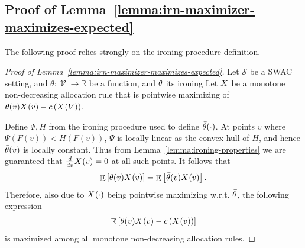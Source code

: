 \documentclass[11pt,letterpaper]{article}
\newcommand{\sqbr}[1]{\left[ #1 \right]}
\newcommand{\brackets}[1]{\left( #1 \right)}
\newcommand{\swac}{SWAC\xspace}
\newcommand{\reals}{\mathbb{R}}
\DeclareMathOperator*{\E}{\bb{E}}
\newcommand{\bb}[1]{\mathbb{#1}}
\renewcommand{\S}{\mathcal{S}}
\DeclareMathOperator{\V}{\mathcal{V}}
\theoremstyle{plain}
\begin{document}
\subsection{Proof of Lemma~\ref{lemma:irn-maximizer-maximizes-expected}}
\label{sec:proof-optimal-rental-mechs}
The following proof relies strongly on the ironing procedure definition.
\begin{proof}[Proof of Lemma~\ref{lemma:irn-maximizer-maximizes-expected}]
 Let $\S$ be a \swac setting, and $\theta:\V\rightarrow\reals$ be a function, and $\Bar{\theta}$ its ironing
    Let $\alloc$ be a monotone non-decreasing allocation rule that is pointwise maximizing of $\Bar{\theta}(v)\x{v}-c\brackets{\x{V}}$.
    
    Define $\Psi,H$ from the ironing procedure used to define $\Bar{\theta}(\cdot)$.
    At points $v$ where $\Psi(F(v))<H(F(v))$, $\Psi$ is locally linear as the convex hull of $H$, and hence $\Bar{\theta}(v)$ is locally constant. Thus from Lemma~\ref{lemma:ironing-properties} we are guaranteed that $\frac{d}{dv}\x{v}=0$ at all such points.
    It follows that
    \begin{equation}
         \E\sqbr{\theta(v)\x{v}}=\E\sqbr{\Bar{\theta}(v)\x{v}}.
    \end{equation}
    Therefore, also due to $\x{\cdot}$ being pointwise maximizing w.r.t. $\Bar{\theta}$, the following expression
    \begin{align}\label{eq:best-rew}
        \E\sqbr{\theta(v)\x{v}-c\brackets{\x{v}}}
    \end{align}
    is maximized among all monotone non-decreasing allocation rules.
\end{proof}



\end{document}
